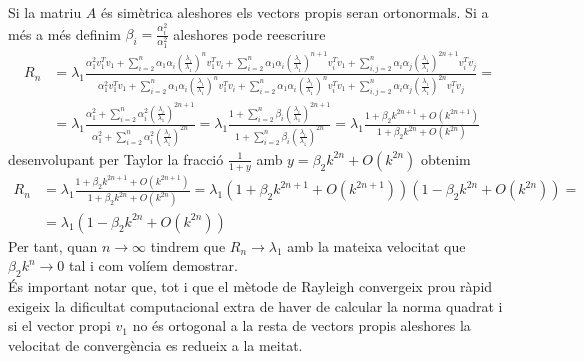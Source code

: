 \documentclass[a4paper,10pt]{article}
\renewcommand{\*}{\cdot}
\renewcommand{\(}{\left(}
\renewcommand{\)}{\right)}
\begin{document}
Si la matriu $A$ és simètrica aleshores els vectors propis seran ortonormals. Si a més a més definim $\beta_i=\frac{\alpha_i^2}{\alpha_1^2}$ aleshores pode reescriure
\begin{equation*}
 \begin{split}
  R_n&=\lambda_1\frac{\alpha_1^2v_1^Tv_1+\sum_{i=2}^n\alpha_1\alpha_i\(\frac{\lambda_i}{\lambda_1}\)^nv_1^Tv_i+\sum_{i=2}^n\alpha_1\alpha_i\(\frac{\lambda_i}{\lambda_1}\)^{n+1}
  v_i^Tv_1+\sum_{i,j=2}^n\alpha_i\alpha_j\(\frac{\lambda_i}{\lambda_1}\)^{2n+1}v_i^Tv_j}{\alpha_1^2v_1^Tv_1+\sum_{i=2}^n\alpha_1\alpha_i\(\frac{\lambda_i}{\lambda_1}\)^n
  v_1^Tv_i+\sum_{i=2}^n\alpha_1\alpha_i\(\frac{\lambda_i}{\lambda_1}\)^{n}v_i^Tv_1+\sum_{i,j=2}^n\alpha_i\alpha_j\(\frac{\lambda_i}{\lambda_1}\)^{2n}v_i^Tv_j}=\\
  &=\lambda_1\frac{\alpha_1^2+\sum_{i=2}^n\alpha_i^2\(\frac{\lambda_i}{\lambda_1}\)^{2n+1}}{\alpha_1^2+\sum_{i=2}^n\alpha_i^2\(\frac{\lambda_i}{\lambda_1}\)^{2n}}=
  \lambda_1\frac{1+\sum_{i=2}^n\beta_i\(\frac{\lambda_i}{\lambda_1}\)^{2n+1}}{1+\sum_{i=2}^n\beta_i\(\frac{\lambda_i}{\lambda_1}\)^{2n}}=
  \lambda_1\frac{1+\beta_2k^{2n+1}+O\(k^{2n+1}\)}{1+\beta_2k^{2n}+O\(k^{2n}\)}
 \end{split}
\end{equation*}
desenvolupant per Taylor la fracció $\frac{1}{1+y}$ amb $y=\beta_2k^{2n}+O\(k^{2n}\right)$ obtenim
\begin{equation*}
 \begin{split}
  R_n&=\lambda_1\frac{1+\beta_2k^{2n+1}+O\(k^{2n+1}\)}{1+\beta_2k^{2n}+O\(k^{2n}\)}=\lambda_1\(1+\beta_2k^{2n+1}+O\(k^{2n+1}\)\)\(1-\beta_2k^{2n}+O\(k^{2n}\)\)=\\
  &=\lambda_1\(1-\beta_2k^{2n}+O\(k^{2n}\)\)
 \end{split}
\end{equation*}
Per tant, quan $n\to\infty$ tindrem que $R_n\to\lambda_1$ amb la mateixa velocitat que $\beta_2k^n\to0$ tal i com volíem demostrar.\\
És important notar que, tot i que el mètode de Rayleigh convergeix prou ràpid exigeix la dificultat computacional extra de haver de calcular la norma quadrat i si el vector
propi $v_1$ no és ortogonal a la resta de vectors propis aleshores la velocitat de convergència es redueix a la meitat.
\end{document}
